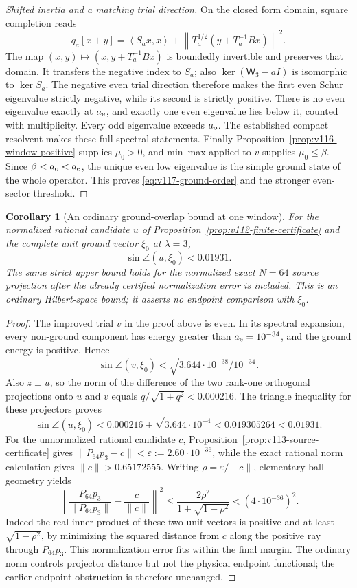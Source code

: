 \documentclass[11pt]{article}
\newtheorem{corollary}[theorem]{Corollary}
\theoremstyle{remark}
\newcommand{\norm}[1]{\left\lVert #1\right\rVert}
\newcommand{\ip}[2]{\left\langle #1,#2\right\rangle}
\begin{document}
\begin{proof}[Shifted inertia and a matching trial direction]
On the closed form domain, square completion reads
\[
 q_a[x+y]=\ip{S_ax}{x}
       +\norm{T_a^{1/2}(y+T_a^{-1}Bx)}^2.
\]
The map $(x,y)\mapsto(x,y+T_a^{-1}Bx)$ is boundedly invertible and
preserves that domain.  It transfers the negative index to $S_a$;
also $\ker(\mathsf W_3-aI)$ is isomorphic to $\ker S_a$.
The negative even trial direction therefore makes the first even
Schur eigenvalue strictly negative, while its second is strictly
positive.  There is no even eigenvalue exactly at $a_{\rm e}$, and
exactly one even eigenvalue lies below it, counted with multiplicity.
Every odd eigenvalue exceeds $a_{\rm o}$.  The established compact
resolvent makes these full spectral statements.  Finally
Proposition~\ref{prop:v116-window-positive} supplies $\mu_0>0$,
and min--max applied to $v$ supplies $\mu_0\le\beta$.
Since $\beta<a_{\rm o}<a_{\rm e}$, the unique even low eigenvalue is
the simple ground state of the whole operator.  This proves
\eqref{eq:v117-ground-order} and the stronger even-sector threshold.
\end{proof}

\begin{corollary}[An ordinary ground-overlap bound at one window]
\label{cor:v117-ground-overlap}
For the normalized rational candidate $u$ of
Proposition~\ref{prop:v112-finite-certificate} and the complete unit
ground vector $\xi_0$ at $\lambda=3$,
\[
 \sin\angle(u,\xi_0)<0.01931.
\]
The same strict upper bound holds for the normalized exact $N=64$
source projection after the already certified normalization error is
included.  This is an ordinary Hilbert-space bound; it asserts no
endpoint comparison with $\xi_0$.
\end{corollary}
\begin{proof}
The improved trial $v$ in the proof above is even.  In its spectral
expansion, every non-ground component has energy greater than
$a_{\rm e}=10^{-34}$, and the ground energy is positive.  Hence
\[
 \sin\angle(v,\xi_0)
 <\sqrt{3.644\cdot10^{-38}/10^{-34}}.
\]
Also $z\perp u$, so the norm of the difference of the two rank-one
orthogonal projections onto $u$ and $v$ equals
$q/\sqrt{1+q^2}<0.000216$.  The triangle inequality for these
projectors proves
\[
 \sin\angle(u,\xi_0)
 <0.000216+\sqrt{3.644\cdot10^{-4}}
 <0.019305264<0.01931.
\]
For the unnormalized rational candidate $c$,
Proposition~\ref{prop:v113-source-certificate} gives
$\|P_{64}p_3-c\|<\varepsilon:=2.60\cdot10^{-36}$, while the
exact rational norm calculation gives $\|c\|>0.65172555$.
Writing $\rho=\varepsilon/\|c\|$, elementary ball geometry yields
\[
 \left\|\frac{P_{64}p_3}{\|P_{64}p_3\|}-\frac c{\|c\|}\right\|^2
 \le\frac{2\rho^2}{1+\sqrt{1-\rho^2}}<(4\cdot10^{-36})^2.
\]
Indeed the real inner product of these two unit vectors is positive
and at least $\sqrt{1-\rho^2}$, by minimizing the squared distance
from $c$ along the positive ray through $P_{64}p_3$.
This normalization error fits within the final margin.  The ordinary
norm controls projector distance but not the physical endpoint
functional; the earlier endpoint obstruction is therefore unchanged.
\end{proof}
\end{document}
